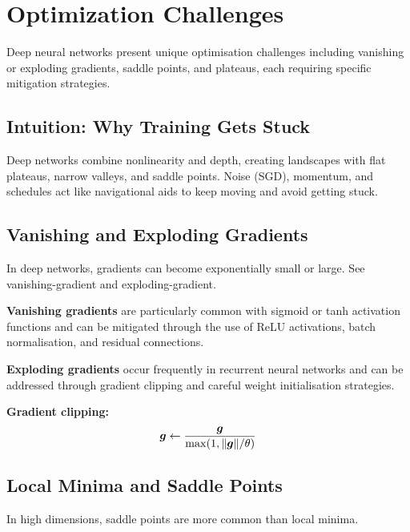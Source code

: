 
\section{Optimization Challenges }
\label{sec:challenges}

Deep neural networks present unique optimisation challenges including vanishing or exploding gradients, saddle points, and plateaus, each requiring specific mitigation strategies.

\subsection{Intuition: Why Training Gets Stuck}

Deep networks combine nonlinearity and depth, creating landscapes with flat plateaus, narrow valleys, and saddle points. Noise (SGD), momentum, and schedules act like navigational aids to keep moving and avoid getting stuck.

\subsection{Vanishing and Exploding Gradients}

In deep networks, gradients can become exponentially small or large. See \gls{vanishing-gradient} and \gls{exploding-gradient}.

\textbf{Vanishing gradients} are particularly common with sigmoid or tanh activation functions and can be mitigated through the use of ReLU activations, batch normalisation, and residual connections.

\textbf{Exploding gradients} occur frequently in recurrent neural networks and can be addressed through gradient clipping and careful weight initialisation strategies.

\textbf{Gradient clipping:}
\begin{equation}
\boldsymbol{g} \leftarrow \frac{\boldsymbol{g}}{\max(1, \|\boldsymbol{g}\| / \theta)}
\end{equation}

\subsection{Local Minima and Saddle Points}

In high dimensions, saddle points are more common than local minima.


